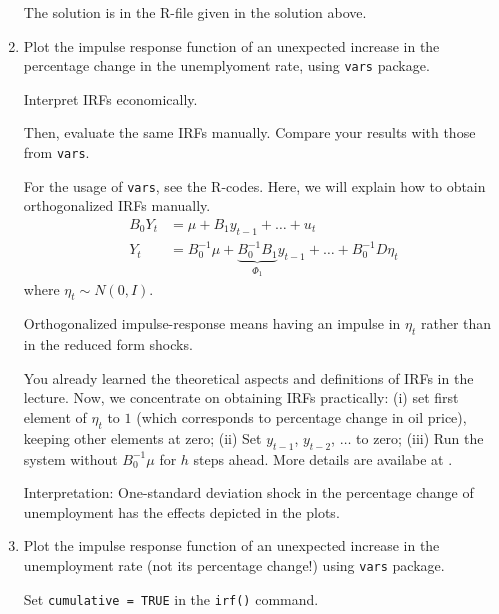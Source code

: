 \begin{enumerate}
          \begin{sol}
              The solution is in the R-file given in the solution above.
          \end{sol}

    \item Plot the impulse response function of an unexpected increase in the percentage change in the unemplyoment rate, using \verb|vars| package.

          Interpret IRFs economically.

          Then, evaluate the same IRFs manually. Compare your results with those from \verb|vars|.

          \begin{sol}
              For the usage of \verb|vars|, see the R-codes. Here, we will explain how to obtain orthogonalized IRFs manually.
              \begin{align*}
                  B_0 Y_t
                   & = \mu + B_1 y_{t-1} + \ldots + u_t
                  \\
                  Y_t
                   & = B_0^{-1} \mu
                  + \underbrace{B_0^{-1} B_1}_{\Phi_1} y_{t-1}
                  + \ldots
                  + B_0^{-1} D \eta_t
              \end{align*}
              where $\eta_t \sim N(0, I)$.

              Orthogonalized impulse-response means having an impulse in $\eta_t$ rather than in the reduced form shocks.

              You already learned the theoretical aspects and definitions of IRFs in the lecture. Now, we concentrate on obtaining IRFs practically: (i) set first element of $\eta_t$ to $1$ (which corresponds to percentage change in oil price), keeping other elements at zero; (ii) Set $y_{t-1}$, $y_{t-2}$, $\ldots$ to zero; (iii) Run the system without $B_0^{-1} \mu$ for $h$ steps ahead. More details are availabe at \cite[][see pages 319, 322-323]{Hamilton-1994}.

              Interpretation: One-standard deviation shock in the percentage change of unemployment has the effects depicted in the plots.
          \end{sol}

    \item Plot the impulse response function of an unexpected increase in the unemployment rate (not its percentage change!) using \verb|vars| package.

          \begin{sol}
              Set \verb|cumulative = TRUE| in the \verb|irf()| command.


\end{sol}
\end{enumerate}

